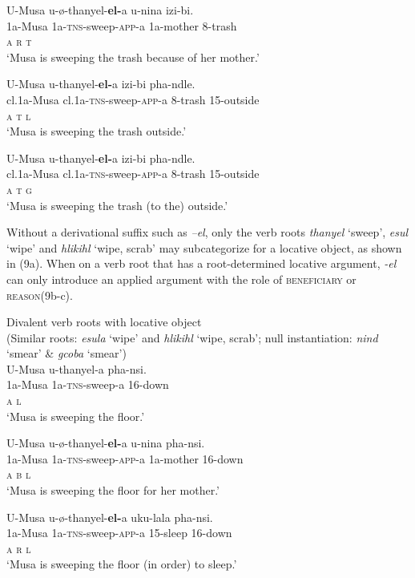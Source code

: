 \documentclass[output=paper]{langsci/langscibook}
\begin{document}
\ex
\gll U-Musa u-ø-thanyel-\textbf{el-}a u-nina izi-bi. \\
 1a-Musa 1a-\textsc{tns}-sweep-\textsc{app}-a 1a-mother 8-trash\\
 \textsc{a r t}\\
\glt ‘Musa is sweeping the trash because of her mother.’

\ex
\gll U-Musa u-thanyel-\textbf{el-}a izi-bi pha-ndle. \\
 cl.1a-Musa cl.1a-\textsc{tns}-sweep-\textsc{app}-a 8-trash 15-outside\\
 \textsc{a t l}\\
\glt ‘Musa is sweeping the trash outside.’

\ex
\gll U-Musa u-thanyel-\textbf{el-}a izi-bi pha-ndle. \\
 cl.1a-Musa cl.1a-\textsc{tns}-sweep-\textsc{app}-a 8-trash 15-outside\\
 \textsc{a t g}\\
\glt ‘Musa is sweeping the trash (to the) outside.’
\z
\z

Without a derivational suffix such as \textit{–el}, only the verb roots \textit{thanyel} ‘sweep’, \textit{esul} ‘wipe’ and \textit{hlikihl} ‘wipe, scrab’ may subcategorize for a locative object, as shown in (9a). When on a verb root that has a root-determined locative argument, \textit{-el} can only introduce an applied argument with the role of \textsc{beneficiary} or \textsc{reason}\textit {}(9b-c). 

\ea
{Divalent verb roots with locative object }\\
 (Similar roots: \textit{esula} ‘wipe’ and \textit{hlikihl} ‘wipe, scrab’; null instantiation: \textit{nind} ‘smear’ \& \textit{gcoba} ‘smear’)\\
\ea
\gll U-Musa u-thanyel-a pha-nsi. \\
 1a-Musa 1a-\textsc{tns}-sweep-a 16-down\\
 \textsc{a l}\\
\glt ‘Musa is sweeping the floor.’

\ex
\gll U-Musa u-ø-thanyel-\textbf{el-}a u-nina pha-nsi.\\
 1a-Musa 1a-\textsc{tns}-sweep-\textsc{app}-a 1a-mother 16-down\\
 \textsc{a b l}\\
\glt ‘Musa is sweeping the floor for her mother.’

\ex
\gll U-Musa u-ø-thanyel-\textbf{el-}a uku-lala pha-nsi.\\
 1a-Musa 1a-\textsc{tns}-sweep-\textsc{app}-a 15-sleep 16-down\\
 \textsc{a r l}\\
\glt ‘Musa is sweeping the floor (in order) to sleep.’
\z
\z
\end{document}
